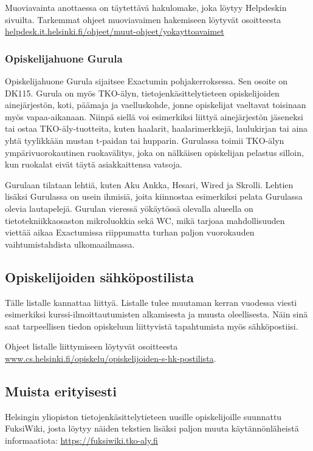 \documentclass[../ala_hataile.tex]{subfiles}
\begin{document}
	Muoviavainta anottaessa on täytettävä
	haku\-lomake, joka löytyy Help\-deskin sivuilta.
	Tarkemmat ohjeet muovi\-avaimen
	hakemiseen löytyvät
	osoitteesta \url{helpdesk.it.helsinki.fi/ohjeet/muut-ohjeet/yokayttoavaimet}
	
	\subsubsection*{Opiskelijahuone Gurula}
	Opiskelijahuone Gurula sijaitsee
	Exactumin pohjakerroksessa. Sen osoite
	on DK115. Gurula on myös TKO-älyn,
	tietojen\-käsittely\-tieteen opiskelijoiden ainejärjestön,
	koti, päämaja ja vaelluskohde,
	jonne opiskelijat vaeltavat toisinaan myös
	vapaa-aikanaan. Niinpä siellä voi esimerkiksi
	liittyä ainejärjestön jäseneksi tai ostaa
	TKO-äly-tuotteita, kuten haalarit, haalarimerkkejä,
	laulukirjan tai aina yhtä tyylikkään
	mustan t-paidan tai hupparin. Gurulassa toimii
	TKO-älyn ympärivuorokautinen ruokavälitys,
	joka on nälkäisen opiskelijan pelastus
	silloin, kun ruokalat eivät täytä asiakkaittensa
	vatsoja.
	
	Gurulaan tilataan lehtiä, kuten Aku Ankka, 
	Hesari, Wired ja Skrolli. Lehtien lisäksi Gurulassa on
	usein ihmisiä, joita kiinnostaa esimerkiksi
	pelata Gurulassa olevia lautapelejä. Gurulan
	vieressä yökäytössä olevalla alueella
	on tietotekniikkaosaston mikroluokkia
	sekä WC, mikä tarjoaa mahdollisuuden
	viettää aikaa Exactumissa riippumatta
	turhan paljon vuorokauden vaihtumistahdista
	ulkomaailmassa.
	
	\subsection*{Opiskelijoiden sähköpostilista}
	Tälle listalle kannattaa liittyä. Listalle
	tulee muutaman kerran vuodessa viesti
	esimerkiksi
	kurssi-ilmoittautumisten alkamisesta
	ja muusta oleellisesta. Näin sinä
	saat tarpeellisen tiedon opiskeluun liittyvistä
	tapahtumista myös sähköpostiisi.
	
	Ohjeet listalle liittymiseen löytyvät osoitteesta
	\url{www.cs.helsinki.fi/opiskelu/opiskelijoiden-s-hk-postilista}.
	
	\subsection*{Muista erityisesti}
	Helsingin yliopiston
	tietojen\-käsittely\-tieteen uusille opiskelijoille
	suunnattu FuksiWiki, josta löytyy näiden
	tekstien lisäksi paljon muuta käytännönläheistä
	informaatiota: \url{https://fuksiwiki.tko-aly.fi}
	
\end{document}
